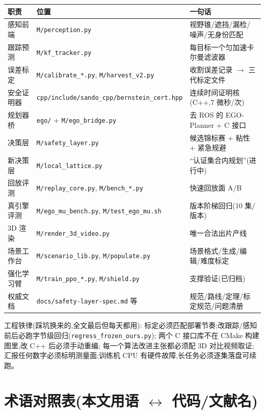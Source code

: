 \documentclass[11pt]{ctexart}
\newcommand{\code}[1]{\texttt{#1}}
\begin{document}
\begin{center}
\small
\begin{tabular}{@{}llp{7.2cm}@{}}
\toprule
职责 & 位置 & 一句话 \\
\midrule
感知前端 & \code{M/perception.py} & 视野锥/遮挡/漏检/噪声/无身份匹配 \\
跟踪预测 & \code{M/kf\_tracker.py} & 每目标一个匀加速卡尔曼滤波器 \\
误差标定 & \code{M/calibrate\_*.py}, \code{M/harvest\_v2.py} & 收割误差记录 $\to$ 三代标定文件 \\
安全证明器 & \code{cpp/include/sando\_cpp/bernstein\_cert.hpp} & 连续时间证明核(C++,7 微秒/次) \\
规划器桥 & \code{ego/} + \code{M/ego\_bridge.py} & 去 ROS 的 EGO-Planner + C 接口 \\
决策层 & \code{M/safety\_layer.py} & 候选锦标赛 + 粘性 + 紧急规避 \\
新决策层 & \code{M/local\_lattice.py} & ``认证集合内规划''(进行中) \\
回放评测 & \code{M/replay\_core.py}, \code{M/bench\_*.py} & 快速回放面 A/B \\
真引擎评测 & \code{M/ego\_mu\_bench.py}, \code{M/test\_ego\_mu.sh} & 版本阶梯回归(10 集/版本) \\
3D 渲染 & \code{M/render\_3d\_video.py} & 唯一合法出片产线 \\
场景工作台 & \code{M/scenario\_lib.py}, \code{M/populate.py} & 场景格式/生成/编辑/难度标定 \\
强化学习臂 & \code{M/train\_ppo\_*.py}, \code{M/shield.py} & 支撑验证(已归档) \\
权威文档 & \code{docs/safety-layer-spec.md} 等 & 规范/路线/定理/标定规范/问题清册 \\
\bottomrule
\end{tabular}
\end{center}

工程铁律(踩坑换来的,全文最后但每天都用):
标定必须匹配部署节奏;改跟踪/感知前后必跑字节级回归(\code{regress\_frozen\_ours.py});
两个 C 接口库不在 CMake 构建图里,改 C++ 后必须手动重编;
每一个算法改进主张都必须配 3D 对比视频取证;
汇报任何数字必须标明测量面;训练机 CPU 有硬件故障,长任务必须逐集落盘可续跑。

\appendix

\section{术语对照表(本文用语 $\leftrightarrow$ 代码/文献名)}\label{app:glossary}
\end{document}

